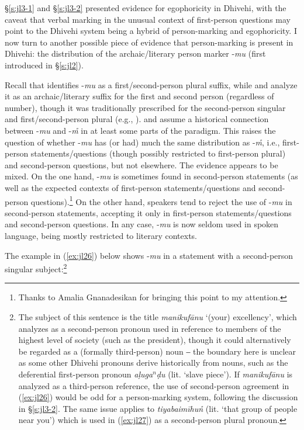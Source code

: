 \documentclass[output=paper]{langsci/langscibook}
\begin{document}
§‎\ref{s:jl3-1} and §‎\ref{s:jl3-2} presented evidence for egophoricity in Dhivehi, with the caveat that verbal marking in the unusual context of first-person questions may point to the Dhivehi system being a hybrid of person-marking and egophoricity. I now turn to another possible piece of evidence that person-marking is present in Dhivehi: the distribution of the archaic/literary person marker -\textit{mu} (first introduced in §‎\ref{s:jl2}). 

Recall that \cite{Fritz2002} identifies -\textit{mu} as a first/second-person plural suffix, while \cite{CainGair2000} and \cite{Gnanadesikan2017} analyze it as an archaic/literary suffix for the first and second person (regardless of number), though it was traditionally prescribed for the second-person singular and first/second-person plural (e.g., \citealt{Ahmad1970}). \cite[169]{Fritz2002} and \cite[27]{CainGair2000} assume a historical connection between -\textit{mu} and -\textit{m̊} in at least some parts of the paradigm. This raises the question of whether -\textit{mu} has (or had) much the same distribution as -\textit{m̊}, i.e., first-person statements/questions (though possibly restricted to first-person plural) and second-person questions, but not elsewhere. The evidence appears to be mixed. On the one hand, -\textit{mu} is sometimes found in second-person statements (as well as the expected contexts of first-person statements/questions and second-person questions).\footnote{Thanks to Amalia Gnanadesikan for bringing this point to my attention.}
On the other hand, speakers tend to reject the use of -\textit{mu} in second-person statements, accepting it only in first-person statements/questions and second-person questions. In any case, ‑\textit{mu} is now seldom used in spoken language, being mostly restricted to literary contexts.
   
The example in (\ref{ex:jl26}) below shows ‑\textit{mu} in a statement with a second-person singular subject:\footnote{The subject of this sentence is the title \textit{manikufānu} ‘(your) excellency’, which \cite[136]{Fritz2002} analyzes as a second-person pronoun used in reference to members of the highest level of society (such as the president), though it could alternatively be regarded as a (formally third-person) noun ‒ the boundary here is unclear as some other Dhivehi pronouns derive historically from nouns, such as the deferential first-person pronoun \textit{aḷuga$^n$ḍu} (lit. ‘slave piece’). If \textit{manikufānu} is analyzed as a third-person reference, the use of second-person agreement in (\ref{ex:jl26}) would be odd for a person-marking system, following the discussion in §‎‎\ref{s:jl3-2}. The same issue applies to \textit{tiyabaimīhun̊} (lit. ‘that group of people near you’) which is used in (\ref{ex:jl27}) as a second-person plural pronoun.}
\end{document}
